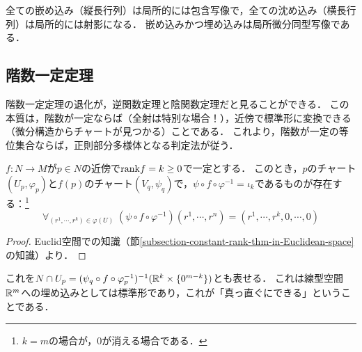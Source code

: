 \documentclass[uplatex,dvipdfmx]{jsreport}
\begin{document}
\begin{tcolorbox}[colframe=ForestGreen, colback=ForestGreen!10!white,breakable,colbacktitle=ForestGreen!40!white,coltitle=black,fonttitle=\bfseries\sffamily,
title=]
    全ての嵌め込み（縦長行列）は局所的には包含写像で，全ての沈め込み（横長行列）は局所的には射影になる．
    嵌め込みかつ埋め込みは局所微分同型写像である．
\end{tcolorbox}

\subsection{階数一定定理}

\begin{tcolorbox}[colframe=ForestGreen, colback=ForestGreen!10!white,breakable,colbacktitle=ForestGreen!40!white,coltitle=black,fonttitle=\bfseries\sffamily,
title=]
    階数一定定理の退化が，逆関数定理と陰関数定理だと見ることができる．
    この本質は，階数が一定ならば（全射は特別な場合！），近傍で標準形に変換できる（微分構造からチャートが見つかる）ことである．
    これより，階数が一定の等位集合ならば，正則部分多様体となる判定法が従う．
\end{tcolorbox}

\begin{theorem}\label{thm-constant-rank-theorem}
    $f:N\to M$が$p\in N$の近傍で$\mathrm{rank} f=k\ge 0$で一定とする．
    このとき，$p$のチャート$(U_p,\varphi_p)$と$f(p)$のチャート$(V_q,\psi_q)$で，$\psi\circ f\circ\varphi^{-1}=\iota_k$であるものが存在する：\footnote{$k=m$の場合が，$0$が消える場合である．}
    \[\forall_{(r^1,\cdots,r^k)\in\varphi(U)}\;(\psi\circ f\circ\varphi^{-1})(r^1,\cdots,r^n)=(r^1,\cdots,r^k,0,\cdots,0)\]
\end{theorem}
\begin{proof}
    Euclid空間での知識（節\ref{subsection-constant-rank-thm-in-Euclidean-space}の知識）より．
\end{proof}
\begin{remarks}
    これを$N\cap U_p=(\psi_q\circ f\circ\varphi_p^{-1})^{-1}(\mathbb{R}^k\times\{0^{m-k}\})$とも表せる．
    これは線型空間$\mathbb{R}^m$への埋め込みとしては標準形であり，これが「真っ直ぐにできる」ということである．
\end{remarks}
\end{document}
